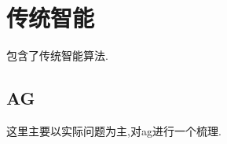 \chapter{传统智能}
\label{chap:ag}
包含了传统智能算法.

\section*{AG}
\label{sec:ag}
这里主要以实际问题为主,对ag进行一个梳理.
\endinput